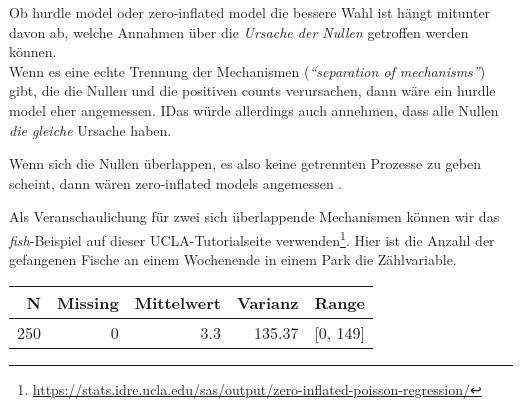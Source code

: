\documentclass[ngerman,a4paper,]{scrartcl}
\newenvironment{Shaded}{\begin{snugshade}}{\end{snugshade}}
\newcommand{\CommentTok}[1]{\textcolor[rgb]{0.56,0.35,0.01}{\textit{#1}}}
\newcommand{\DataTypeTok}[1]{\textcolor[rgb]{0.13,0.29,0.53}{#1}}
\newcommand{\DecValTok}[1]{\textcolor[rgb]{0.00,0.00,0.81}{#1}}
\newcommand{\FloatTok}[1]{\textcolor[rgb]{0.00,0.00,0.81}{#1}}
\newcommand{\KeywordTok}[1]{\textcolor[rgb]{0.13,0.29,0.53}{\textbf{#1}}}
\newcommand{\NormalTok}[1]{#1}
\newcommand{\OperatorTok}[1]{\textcolor[rgb]{0.81,0.36,0.00}{\textbf{#1}}}
\newcommand{\StringTok}[1]{\textcolor[rgb]{0.31,0.60,0.02}{#1}}
\DeclareRobustCommand{\href}[2]{#2\footnote{\url{#1}}}
\theoremstyle{definition}
\theoremstyle{definition}
\theoremstyle{definition}
\theoremstyle{remark}
\begin{document}
Ob hurdle model oder zero-inflated model die bessere Wahl ist hängt mitunter davon ab, welche Annahmen über die \emph{Ursache der Nullen} getroffen werden können.\\
Wenn es eine echte Trennung der Mechanismen (\emph{\enquote{separation of mechanisms}}) gibt, die die Nullen und die positiven counts verursachen, dann wäre ein hurdle model eher angemessen. IDas würde allerdings auch annehmen, dass alle Nullen \emph{die gleiche} Ursache haben.

Wenn sich die Nullen überlappen, es also keine getrennten Prozesse zu geben scheint, dann wären zero-inflated models angemessen \citep[p.~209]{hilbeModelingCountData2014}.

Als Veranschaulichung für zwei sich überlappende Mechanismen können wir das \emph{fish}-Beispiel auf \href{https://stats.idre.ucla.edu/sas/output/zero-inflated-poisson-regression/}{dieser UCLA-Tutorialseite verwenden}. Hier ist die Anzahl der gefangenen Fische an einem Wochenende in einem Park die Zählvariable.

\begin{Shaded}
\end{Shaded}

\begin{table}[H]
\centering
\begin{tabular}{rrrrl}
\toprule
N & Missing & Mittelwert & Varianz & Range\\
\midrule
250 & 0 & 3.3 & 135.37 & [0, 149]\\
\bottomrule
\end{tabular}
\end{table}

\begin{Shaded}
\end{Shaded}
\end{document}
